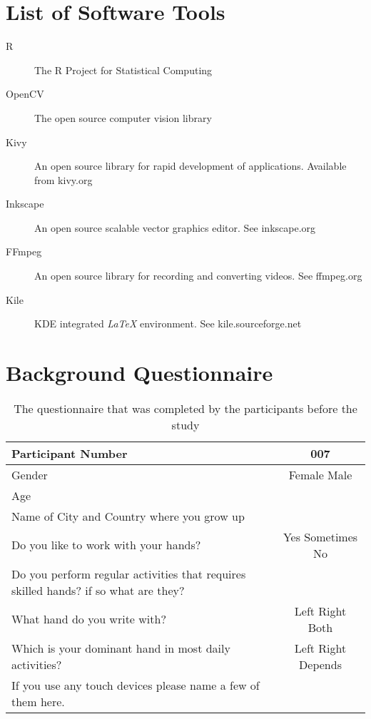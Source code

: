 \label{chapter:appendix}

\section{List of Software Tools}
\begin{description}
 \item[R] The R Project for Statistical Computing
 \item[OpenCV] The open source computer vision library
 \item[Kivy] An open source library for rapid development of applications. Available from kivy.org
 \item[Inkscape] An open source scalable vector graphics editor. See inkscape.org
 \item[FFmpeg] An open source library for recording and converting videos. See
ffmpeg.org
 \item[Kile] KDE integrated \textit{LaTeX} environment. See kile.sourceforge.net
\end{description}
\clearpage

\section{Background Questionnaire}
\begin{table}[h]
 \centering
 \caption{The questionnaire that was completed by the participants before the study}
\begin{tabular}{|p{4 in}|c|}
\hline
Participant Number
&
007
\\
\hline
Gender
&
Female \hspace{10 mm} Male
\\
\hline
Age
&
\\
\hline
Name of City and Country where you grow up
&
\\
\hline
Do you like to work with your hands?
&
Yes \hspace{10 mm} Sometimes \hspace{10 mm} No
\\
\hline
Do you perform regular activities that requires skilled hands? if so what are they?
&
\\
\hline
What hand do you write with?
&
Left \hspace{10 mm} Right \hspace{10 mm} Both
\\
\hline
Which is your dominant hand in most daily activities?
&
Left \hspace{5 mm}
Right \hspace{5 mm}
Depends
\\
\hline
If you use any touch devices please name a few of them here.
&
\\
\hline
\end{tabular} 
\end{table}
\clearpage

